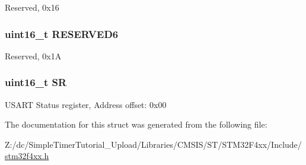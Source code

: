 Reserved, 0x16 \hypertarget{struct_u_s_a_r_t___type_def_aab502dde158ab7da8e7823d1f8a06edb}{
\subsubsection[{R\-E\-S\-E\-R\-V\-E\-D6}]{\setlength{\rightskip}{0pt plus 5cm}uint16\-\_\-t R\-E\-S\-E\-R\-V\-E\-D6}}\label{struct_u_s_a_r_t___type_def_aab502dde158ab7da8e7823d1f8a06edb}
Reserved, 0x1\-A \hypertarget{struct_u_s_a_r_t___type_def_a44962ea5442d203bf4954035d1bfeb9d}{
\subsubsection[{S\-R}]{ uint16\-\_\-t S\-R}}\label{struct_u_s_a_r_t___type_def_a44962ea5442d203bf4954035d1bfeb9d}
U\-S\-A\-R\-T Status register, Address offset\-: 0x00 

The documentation for this struct was generated from the following file\-:\begin{DoxyCompactItemize}
\item 
Z\-:/dc/\-Simple\-Timer\-Tutorial\-\_\-\-Upload/\-Libraries/\-C\-M\-S\-I\-S/\-S\-T/\-S\-T\-M32\-F4xx/\-Include/\hyperlink{stm32f4xx_8h}{stm32f4xx.\-h}\end{DoxyCompactItemize}
